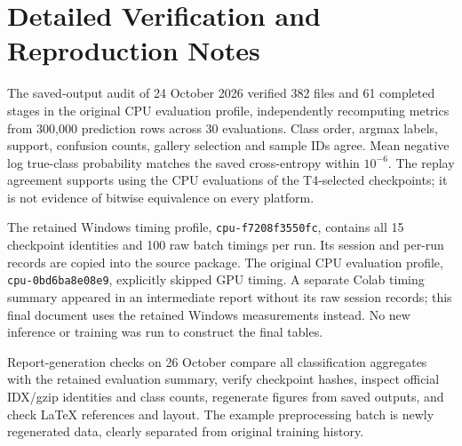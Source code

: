 \begin{table}[H]\centering\small
\caption{MLP official-test per-class metrics, mean \(\pm\) sample SD, \(n=3\).}

\end{table}

\begin{table}[H]\centering\small
\caption{CNN official-test per-class metrics, mean \(\pm\) sample SD, \(n=3\).}

\end{table}

\begin{table}[H]\centering\small
\caption{GRU official-test per-class metrics, mean \(\pm\) sample SD, \(n=3\).}

\end{table}

\begin{table}[H]\centering\small
\caption{Transformer official-test per-class metrics, mean \(\pm\) sample SD, \(n=3\).}

\end{table}

\FloatBarrier
\section{Detailed Verification and Reproduction Notes}
\label{app:verification}
The saved-output audit of 24 October 2026 verified 382 files and 61 completed
stages in the original CPU evaluation profile, independently recomputing metrics
from 300,000 prediction rows across 30 evaluations. Class order, argmax labels,
support, confusion counts, gallery selection and sample IDs agree. Mean negative
log true-class probability matches the saved cross-entropy within \(10^{-6}\).
The replay agreement supports using the CPU evaluations of the T4-selected
checkpoints; it is not evidence of bitwise equivalence on every platform.

The retained Windows timing profile, \texttt{cpu-f7208f3550fc}, contains all
15 checkpoint identities and 100 raw batch timings per run. Its session and
per-run records are copied into the source package. The original CPU evaluation
profile, \texttt{cpu-0bd6ba8e08e9}, explicitly skipped GPU timing. A separate
Colab timing summary appeared in an intermediate report without its raw session
records; this final document uses the retained Windows measurements instead.
No new inference or training was run to construct the final tables.

Report-generation checks on 26 October compare all classification aggregates
with the retained evaluation summary, verify checkpoint hashes, inspect official
IDX/gzip identities and class counts, regenerate figures from saved outputs,
and check LaTeX references and layout. The example preprocessing batch is newly
regenerated data, clearly separated from original training history.

